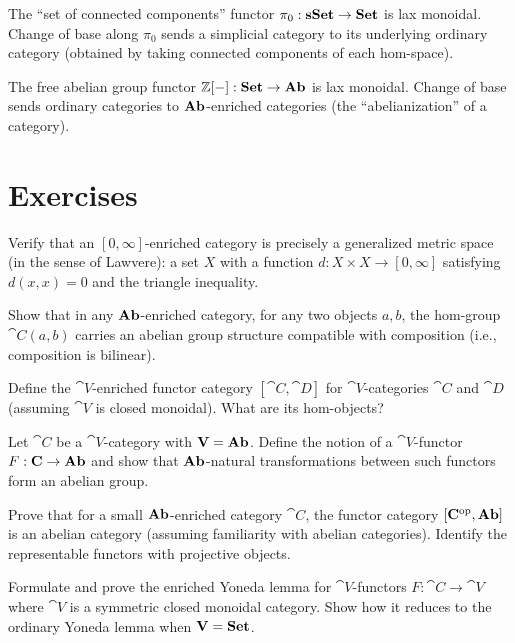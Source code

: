 \begin{example}
The ``set of connected components'' functor $\pi_0: \mathbf{sSet} \to \mathbf{Set}$ is lax monoidal. Change of base along $\pi_0$ sends a simplicial category to its underlying ordinary category (obtained by taking connected components of each hom-space).

The free abelian group functor $\mathbb{Z}[-]: \mathbf{Set} \to \mathbf{Ab}$ is lax monoidal. Change of base sends ordinary categories to $\mathbf{Ab}$-enriched categories (the ``abelianization'' of a category).
\end{example}

\section{Exercises}

\begin{exercise}
Verify that an $[0,\infty]$-enriched category is precisely a generalized metric space (in the sense of Lawvere): a set $X$ with a function $d: X \times X \to [0,\infty]$ satisfying $d(x,x) = 0$ and the triangle inequality.
\end{exercise}

\begin{exercise}
Show that in any $\mathbf{Ab}$-enriched category, for any two objects $a, b$, the hom-group $\cat{C}(a,b)$ carries an abelian group structure compatible with composition (i.e., composition is bilinear).
\end{exercise}

\begin{exercise}
Define the $\cat{V}$-enriched functor category $[\cat{C},\cat{D}]$ for $\cat{V}$-categories $\cat{C}$ and $\cat{D}$ (assuming $\cat{V}$ is closed monoidal). What are its hom-objects?
\end{exercise}

\begin{exercise}[$\star$]
Let $\cat{C}$ be a $\cat{V}$-category with $\mathbf{V} = \mathbf{Ab}$. Define the notion of a $\cat{V}$-functor $F: \mathbf{C} \to \mathbf{Ab}$ and show that $\mathbf{Ab}$-natural transformations between such functors form an abelian group.
\end{exercise}

\begin{exercise}[$\star$]
Prove that for a small $\mathbf{Ab}$-enriched category $\cat{C}$, the functor category $[\mathbf{C}^{\mathrm{op}}, \mathbf{Ab}]$ is an abelian category (assuming familiarity with abelian categories). Identify the representable functors with projective objects.
\end{exercise}

\begin{exercise}[$\star\star$]
Formulate and prove the enriched Yoneda lemma for $\cat{V}$-functors $F: \cat{C} \to \cat{V}$ where $\cat{V}$ is a symmetric closed monoidal category. Show how it reduces to the ordinary Yoneda lemma when $\mathbf{V} = \mathbf{Set}$.
\end{exercise}

